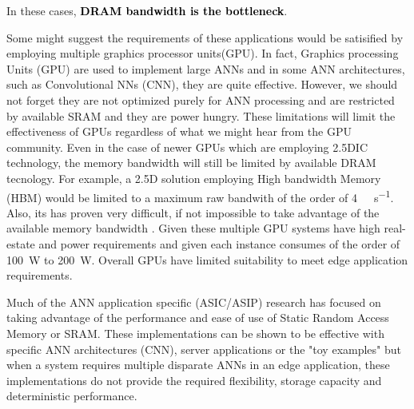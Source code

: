 In these cases, \textbf{\textcolor{black}{DRAM bandwidth is the bottleneck}}.




\iffalse
So considering the performance improvements observed in other applications, it is expected that many customer facing or edge applications will implement multiple instances of artificial neural networks to perform various functions.
have very large memory and processing requirements.
require multiple instances of ANNs of similar size to the ANN described in \cite{krizhevsky2012imagenet}.

For example employing multiple cameras or monitoring and controlling different systems in a drone, a automobile each with an image recognition ANN\cite{krizhevsky2012imagenet}\cite{bojarski2016end} for navigation, engine monitoring along with other system control.
\fi

Some might suggest the requirements of these applications would be satisified by employing multiple graphics processor units(GPU).
In fact, Graphics processing Units (GPU) are used to implement large ANNs and in some ANN architectures, such as Convolutional NNs (CNN), they are quite effective. However, we should not forget they are not optimized purely for ANN processing and are restricted by available SRAM and they are power hungry. These limitations will limit the effectiveness of GPUs regardless of what we might hear from the GPU community.
Even in the case of newer GPUs which are employing 2.5DIC technology, the memory bandwidth will still be limited by available DRAM tecnology.
For example, a 2.5D solution employing High bandwidth Memory (HBM) would be limited to a maximum raw bandwith of the order of \SI[per-mode=symbol]{4}{\tera \bit \per \second}.
Also, its has proven very difficult, if not impossible to take advantage of the available memory bandwidth \cite{farabet2011neuflow} \cite{tensorflow2015-whitepaper}.
Given these multiple GPU systems have high real-estate and power requirements and given each instance consumes of the order of \SI{100}{\watt} to \SI{200}{\watt}.
Overall GPUs have limited suitability to meet edge application requirements.


Much of the ANN application specific (ASIC/ASIP) research has focused on taking advantage of the performance and ease of use of Static Random Access Memory or SRAM. These implementations can be shown to be effective with specific ANN architectures (CNN), server applications or the "toy examples" but when a system requires multiple disparate ANNs in an edge application, these implementations do not provide the required flexibility, storage capacity and deterministic performance.


